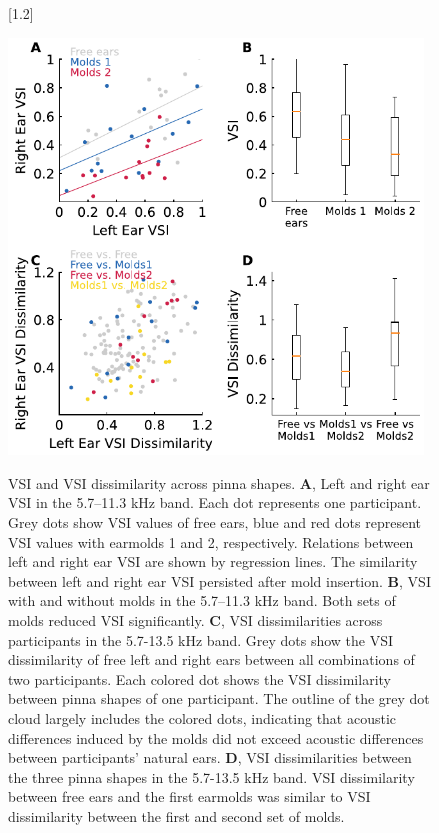 \begin{figure}[hb]
[1.2\FBwidth]
{\caption{VSI and VSI dissimilarity across pinna shapes. \textbf{A}, Left and right ear VSI in the 5.7–11.3 kHz band. Each dot represents one participant. Grey dots show VSI values of free ears, blue and red dots represent VSI values with earmolds 1 and 2, respectively. Relations between left and right ear VSI are shown by regression lines. The similarity between left and right ear VSI persisted after mold insertion. \textbf{B}, VSI with and without molds in the 5.7–11.3 kHz band. Both sets of molds reduced VSI significantly. \textbf{C}, VSI dissimilarities across participants in the 5.7-13.5 kHz band. Grey dots show the VSI dissimilarity of free left and right ears between all combinations of two participants. Each colored dot shows the VSI dissimilarity between pinna shapes of one participant. The outline of the grey dot cloud largely includes the colored dots, indicating that acoustic differences induced by the molds did not exceed acoustic differences between participants' natural ears. \textbf{D}, VSI dissimilarities between the three pinna shapes in the 5.7-13.5 kHz band. VSI dissimilarity between free ears and the first earmolds was similar to VSI dissimilarity between the first and second set of molds.}
\label{fig:molds_vsi}}
{\includegraphics[width=11cm, center]{../Results/figures/fig4/fig4}}
\end{figure}

